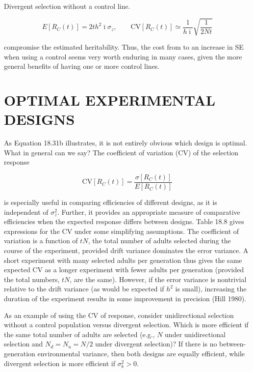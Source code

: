 \documentclass{article}
\begin{document}
Divergent selection without a control line.

\begin{equation}
E\left[R_{C}(t)\right]=2t h^{2}\bar{\imath}\sigma_{z},\qquad\mathrm{C V}\left[R_{C}(t)\right]\simeq\frac{1}{h\bar{\imath}}\sqrt{\frac{1}{2N t}}
\tag{18.32c}
\label{eq:18_32c}
\end{equation}

compromise the estimated heritability. Thus, the cost from to an increase in SE when using a control seems very worth enduring in many cases, given the more general benefits of having one or more control lines.

\section{OPTIMAL EXPERIMENTAL DESIGNS}
As Equation 18.31b illustrates, it is not entirely obvious which design is optimal. What in general can we say? The coefficient of variation (CV) of the selection response

\begin{equation}
\mathrm{CV}\left[R_{C}(t)\right]=\frac{\sigma\left[R_{C}(t)\right]}{E\left[R_{C}(t)\right]}
\tag{18.33}
\label{eq:18_33}
\end{equation}

is especially useful in comparing efficiencies of different designs, as it is independent of  $ \sigma_{z}^{2} $. Further, it provides an appropriate measure of comparative efficiencies when the expected response differs between designs. Table 18.8 gives expressions for the CV under some simplifying assumptions. The coefficient of variation is a function of  $ tN $, the total number of adults selected during the course of the experiment, provided drift variance dominates the error variance. A short experiment with many selected adults per generation thus gives the same expected CV as a longer experiment with fewer adults per generation (provided the total numbers,  $ tN $, are the same). However, if the error variance is nontrivial relative to the drift variance (as would be expected if  $ h^{2} $ is small), increasing the duration of the experiment results in some improvement in precision (Hill 1980).

As an example of using the CV of response, consider unidirectional selection without a control population versus divergent selection. Which is more efficient if the same total number of adults are selected (e.g.,  $ N $ under unidirectional selection and  $ N_d = N_u = N/2 $ under divergent selection)? If there is no between-generation environmental variance, then both designs are equally efficient, while divergent selection is more efficient if  $ \sigma_b^2 > 0 $.
\end{document}
